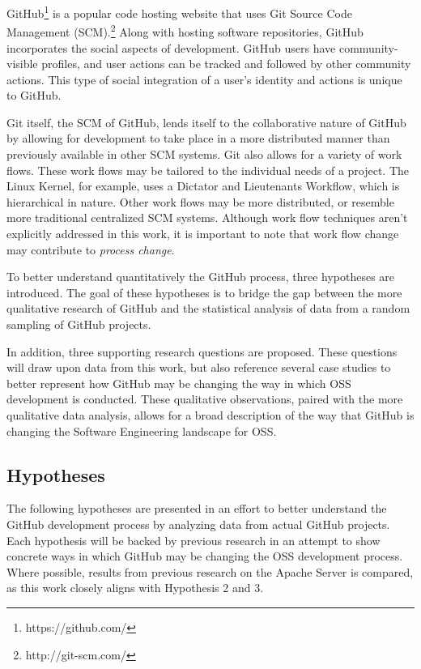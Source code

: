 \documentclass{proc}
\begin{document}
GitHub\footnote{https://github.com/} is a popular code hosting website that uses Git Source Code Management (SCM).\footnote{http://git-scm.com/} Along with hosting software repositories, GitHub incorporates the social aspects of development. GitHub users have community-visible profiles, and user actions can be tracked and followed by other community actions. This type of social integration of a user's identity and actions is unique to GitHub\cite{dabbish2012social}. 

Git itself, the SCM of GitHub, lends itself to the collaborative nature of GitHub by allowing for development to take place in a more distributed manner than previously available in other SCM systems\cite{spinellis2012git}.
Git also allows for a variety of work flows\cite{chacon2009pro}. These work flows may be tailored to the individual needs of a project. The Linux Kernel, for example, uses a Dictator and Lieutenants Workflow\cite{platschekfloss}, which is hierarchical in nature. Other work flows may be more distributed, or resemble more traditional centralized SCM systems. Although work flow techniques aren't explicitly addressed in this work, it is important to note that work flow change may contribute to \textit{process change}.

To better understand quantitatively the GitHub process, three hypotheses are introduced. The goal of these hypotheses is to bridge the gap between the more qualitative research of GitHub\cite{dabbish2012social,begel2013social} and the statistical analysis of data from a random sampling of GitHub projects.

In addition, three supporting research questions are proposed. These questions will draw upon data from this work, but also reference several case studies to better represent how GitHub may be changing the way in which OSS development is conducted. These qualitative observations, paired with the more qualitative data analysis, allows for a broad description of the way that GitHub is changing the Software Engineering landscape for OSS.

\subsection{Hypotheses}
The following hypotheses are presented in an effort to better understand the GitHub development process by analyzing data from actual GitHub projects. Each hypothesis will be backed by previous research in an attempt to show concrete ways in which GitHub may be changing the OSS development process. Where possible, results from previous research on the Apache Server\cite{mockus2000case} is compared, as this work closely aligns with Hypothesis 2 and 3.\\
\end{document}
